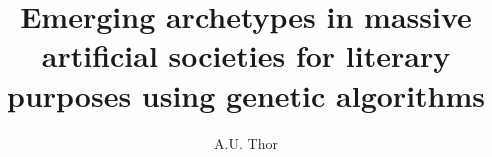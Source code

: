 \documentclass[runningheads]{llncs}
\begin{document}
\mainmatter  %




\title{Emerging archetypes in massive artificial societies for literary purposes using genetic algorithms}


\author{A.U. Thor}
%





\maketitle


\end{document}

